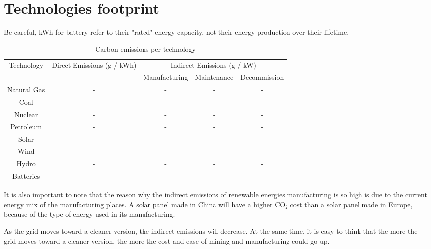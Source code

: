 \section{Technologies footprint}





Be careful, kWh for battery refer to their "rated" energy capacity, not their energy production over their lifetime.

\begin{table*}[h]
\caption[Carbon emissions per technology]{Carbon emissions per technology}
\begin{tabular}{ c c c c c }
	\toprule
	Technology & Direct Emissions (g / kWh) & \multicolumn{3}{c}{Indirect Emissions (g / kW)} \\
	&  & Manufacturing & Maintenance & Decommission \\
	\midrule
	Natural Gas & - & - & - & - \\
	Coal & - & - & - & - \\
	Nuclear & - & - & - & - \\
	Petroleum & - & - & - & - \\
	Solar & - & - & - & - \\
	Wind & - & - & - & - \\
	Hydro & - & - & - & - \\
	Batteries & - & - & - & - \\
	\bottomrule
\end{tabular}

\end{table*}



\begin{kaobox}[frametitle=Indirect emissions\ldots until a cleaner grid?]

It is also important to note that the reason why the indirect emissions of renewable energies manufacturing is so high is due to the current energy mix of the manufacturing places. A solar panel made in China will have a higher $\mathrm{CO_2}$ cost than a solar panel made in Europe, because of the type of energy used in its manufacturing.

As the grid moves toward a cleaner version, the indirect emissions will decrease. At the same time, it is easy to think that the more the grid moves toward a cleaner version, the more the cost and ease of mining and manufacturing could go up.

\end{kaobox}


